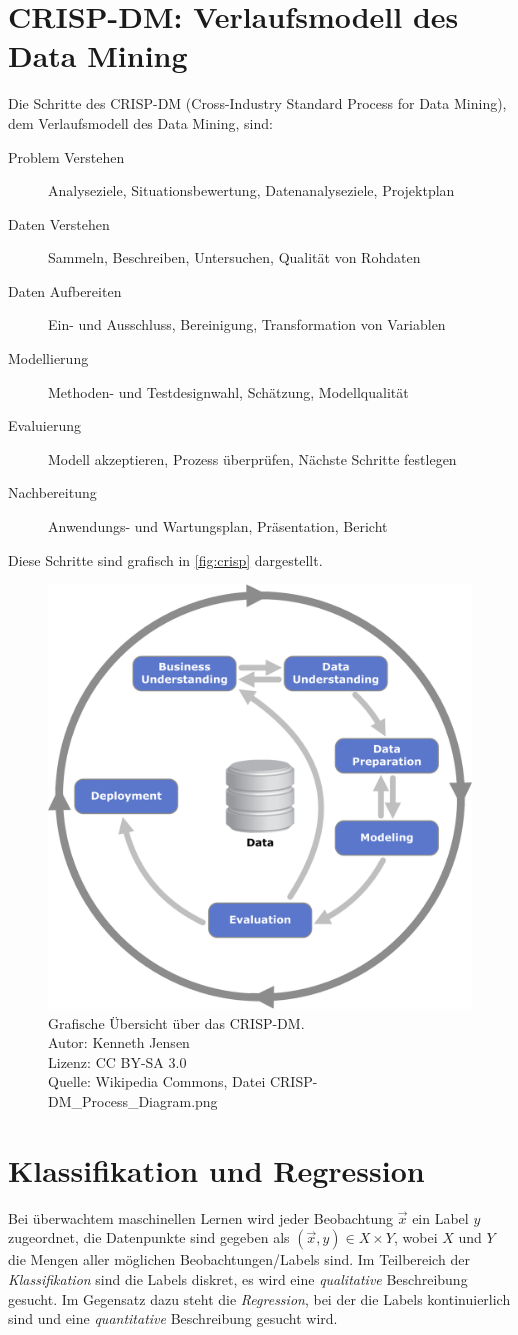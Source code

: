 	\section{CRISP-DM: Verlaufsmodell des Data Mining}
		Die Schritte des CRISP-DM (Cross-Industry Standard Process for Data Mining), dem Verlaufsmodell des Data Mining, sind:
		\begin{description}
			\item[Problem Verstehen] Analyseziele, Situationsbewertung, Datenanalyseziele, Projektplan
			\item[Daten Verstehen] Sammeln, Beschreiben, Untersuchen, Qualität von Rohdaten
			\item[Daten Aufbereiten] Ein- und Ausschluss, Bereinigung, Transformation von Variablen
			\item[Modellierung] Methoden- und Testdesignwahl, Schätzung, Modellqualität
			\item[Evaluierung] Modell akzeptieren, Prozess überprüfen, Nächste Schritte festlegen
			\item[Nachbereitung] Anwendungs- und Wartungsplan, Präsentation, Bericht
		\end{description}
		Diese Schritte sind grafisch in \autoref{fig:crisp} dargestellt.

		\begin{figure}
			\centering
			\includegraphics[width=0.5\linewidth]{img/crisp-dm}
			\caption{Grafische Übersicht über das CRISP-DM. \\ Autor: Kenneth Jensen \\ Lizenz: CC BY-SA 3.0 \\ Quelle: Wikipedia Commons, Datei CRISP-DM\_Process\_Diagram.png}
			\label{fig:crisp}
		\end{figure}

	\section{Klassifikation und Regression}
		Bei überwachtem maschinellen Lernen wird jeder Beobachtung \(\vec{x}\) ein Label \(y\) zugeordnet, \dh die Datenpunkte sind gegeben als \( (\vec{x}, y) \in X \times Y \), wobei \(X\) und \(Y\) die Mengen aller möglichen Beobachtungen/Labels sind. Im Teilbereich der \emph{Klassifikation} sind die Labels diskret, \dh es wird eine \emph{qualitative} Beschreibung gesucht. Im Gegensatz dazu steht die \emph{Regression}, bei der die Labels kontinuierlich sind und eine \emph{quantitative} Beschreibung gesucht wird.


